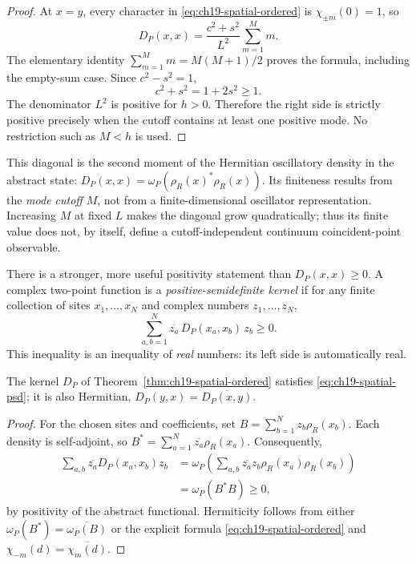 \begin{proof}
At $x=y$, every character in \eqref{eq:ch19-spatial-ordered}
is $\chi_{\pm m}(0)=1$, so
\[
 D_P(x,x)=\frac{c^2+s^2}{L^2}\sum_{m=1}^{M}m.
\]
The elementary identity $\sum_{m=1}^{M}m=M(M+1)/2$ proves the
formula, including the empty-sum case.  Since $c^2-s^2=1$,
\[
 c^2+s^2=1+2s^2\geq1.
\]
The denominator $L^2$ is positive for $h>0$.  Therefore the right
side is strictly positive precisely when the cutoff contains at least
one positive mode.  No restriction such as $M<h$ is used.
\end{proof}

This diagonal is the second moment of the Hermitian oscillatory
density in the abstract state:
$D_P(x,x)=\omega_P(\rho_R(x)^*\rho_R(x))$.
Its finiteness results from the \emph{mode cutoff} $M$, not from a
finite-dimensional oscillator representation.  Increasing $M$ at
fixed $L$ makes the diagonal grow quadratically; thus its finite
value does not, by itself, define a cutoff-independent continuum
coincident-point observable.

There is a stronger, more useful positivity statement than
$D_P(x,x)\geq0$.  A complex two-point function is a
\emph{positive-semidefinite kernel} if for any finite collection of
sites $x_1,\ldots,x_N$ and complex numbers $z_1,\ldots,z_N$,
\begin{equation}
 \sum_{a,b=1}^{N}\overline{z_a}\,D_P(x_a,x_b)\,z_b\geq0.
 \label{eq:ch19-spatial-psd}
\end{equation}
This inequality is an inequality of \emph{real} numbers: its left
side is automatically real.

\begin{proposition}
\label{prop:ch19-spatial-psd}
The kernel $D_P$ of Theorem~\ref{thm:ch19-spatial-ordered} satisfies
\eqref{eq:ch19-spatial-psd}; it is also Hermitian,
$D_P(y,x)=\overline{D_P(x,y)}$.
\end{proposition}

\begin{proof}
For the chosen sites and coefficients, set
$B=\sum_{b=1}^{N}z_b\rho_R(x_b)$.
Each density is self-adjoint, so
$B^*=\sum_{a=1}^{N}\overline{z_a}\rho_R(x_a)$.
Consequently,
\begin{align*}
 \sum_{a,b}\overline{z_a}D_P(x_a,x_b)z_b
 &=\omega_P\!\left(
    \sum_{a,b}\overline{z_a}z_b\rho_R(x_a)\rho_R(x_b)
    \right)\\
 &=\omega_P(B^*B)\geq0,
\end{align*}
by positivity of the abstract functional.  Hermiticity follows
from either $\omega_P(B^*)=\overline{\omega_P(B)}$ or the explicit
formula \eqref{eq:ch19-spatial-ordered} and
$\chi_{-m}(d)=\overline{\chi_m(d)}$.
\end{proof}

